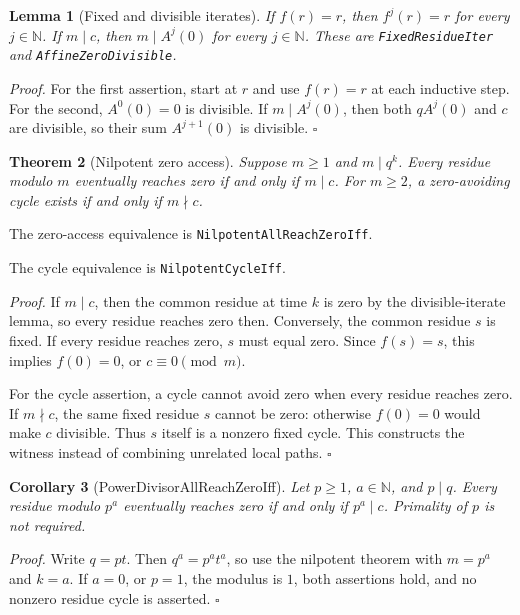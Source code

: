 \documentclass[11pt,letterpaper]{article}
\newcommand{\N}{\mathbb{N}}
\newtheorem{theorem}{Theorem}
\newtheorem{lemma}[theorem]{Lemma}
\newtheorem{corollary}[theorem]{Corollary}
\newenvironment{proof}{\noindent\textit{Proof.}}{\hfill\(\square\)}
\begin{document}
\begin{lemma}[Fixed and divisible iterates]
If \(f(r)=r\), then \(f^j(r)=r\) for every \(j\in\N\).
If \(m\mid c\), then \(m\mid A^j(0)\) for every \(j\in\N\).
These are \texttt{Fixed\allowbreak Residue\allowbreak Iter} and \texttt{Affine\allowbreak Zero\allowbreak Divisible}.
\end{lemma}

\begin{proof}
For the first assertion, start at \(r\) and use \(f(r)=r\)
at each inductive step. For the second, \(A^0(0)=0\) is divisible.
If \(m\mid A^j(0)\), then both \(qA^j(0)\) and \(c\) are
 divisible, so their sum \(A^{j+1}(0)\) is divisible.
\end{proof}

\begin{theorem}[Nilpotent zero access]
Suppose \(m\ge1\) and \(m\mid q^k\). Every residue modulo \(m\)
eventually reaches zero if and only if \(m\mid c\).
For \(m\ge2\), a zero-avoiding cycle exists if and only if
\(m\nmid c\).
\end{theorem}

The zero-access equivalence is \texttt{Nilpotent\allowbreak All\allowbreak Reach\allowbreak Zero\allowbreak Iff}.

The cycle equivalence is \texttt{Nilpotent\allowbreak Cycle\allowbreak Iff}.

\begin{proof}
If \(m\mid c\), then the common residue at time \(k\) is zero
by the divisible-iterate lemma, so every residue reaches zero then.
Conversely, the common residue \(s\) is fixed. If every residue
reaches zero, \(s\) must equal zero. Since \(f(s)=s\), this implies
\(f(0)=0\), or \(c\equiv0\pmod m\).

For the cycle assertion, a cycle cannot avoid zero when every residue
reaches zero. If \(m\nmid c\), the same fixed residue \(s\)
cannot be zero: otherwise \(f(0)=0\) would make \(c\) divisible.
Thus \(s\) itself is a nonzero fixed cycle. This constructs the
witness instead of combining unrelated local paths.
\end{proof}

\begin{corollary}[PowerDivisorAllReachZeroIff]
Let \(p\ge1\), \(a\in\N\), and \(p\mid q\). Every residue
modulo \(p^a\) eventually reaches zero if and only if \(p^a\mid c\).
Primality of \(p\) is not required.
\end{corollary}

\begin{proof}
Write \(q=pt\). Then \(q^a=p^a t^a\), so use the nilpotent
theorem with \(m=p^a\) and \(k=a\). If \(a=0\), or \(p=1\),
the modulus is \(1\), both assertions hold, and no nonzero residue
cycle is asserted.
\end{proof}
\end{document}
